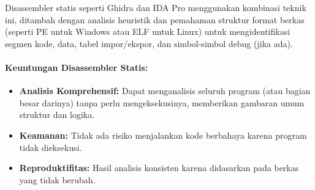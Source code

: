 Disassembler statis seperti Ghidra \cite{Nat19} dan IDA Pro \cite{Hex91} menggunakan kombinasi teknik ini, ditambah dengan analisis heuristik dan pemahaman struktur format berkas (seperti PE untuk Windows atau ELF untuk Linux) untuk mengidentifikasi segmen kode, data, tabel impor/ekspor, dan simbol-simbol debug (jika ada).

\paragraph{Keuntungan Disassembler Statis:}
\begin{itemize}
\item \textbf{Analisis Komprehensif:} Dapat menganalisis seluruh program (atau bagian besar darinya) tanpa perlu mengeksekusinya, memberikan gambaran umum struktur dan logika.
\item \textbf{Keamanan:} Tidak ada risiko menjalankan kode berbahaya karena program tidak dieksekusi.
\item \textbf{Reproduktifitas:} Hasil analisis konsisten karena didasarkan pada berkas yang tidak berubah.
\end{itemize}

